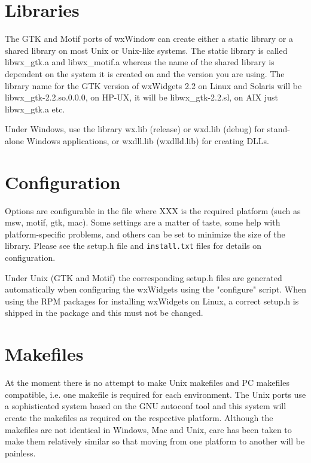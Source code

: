 \section{Libraries}

The GTK and Motif ports of wxWindow can create either a static library or a shared
library on most Unix or Unix-like systems. The static library is called libwx\_gtk.a
and libwx\_motif.a whereas the name of the shared library is dependent on the
system it is created on and the version you are using. The library name for the
GTK version of wxWidgets 2.2 on Linux and Solaris will be libwx\_gtk-2.2.so.0.0.0,
on HP-UX, it will be libwx\_gtk-2.2.sl, on AIX just libwx\_gtk.a etc.

Under Windows, use the library wx.lib (release) or wxd.lib (debug) for stand-alone Windows
applications, or wxdll.lib (wxdlld.lib) for creating DLLs.

\section{Configuration}

Options are configurable in the file
 where XXX is the required platform (such as msw, motif, gtk, mac). Some 
settings are a matter of taste, some help with platform-specific problems, and
others can be set to minimize the size of the library. Please see the setup.h file
and {\tt install.txt} files for details on configuration.

Under Unix (GTK and Motif) the corresponding setup.h files are generated automatically
when configuring the wxWidgets using the "configure" script. When using the RPM packages
for installing wxWidgets on Linux, a correct setup.h is shipped in the package and
this must not be changed.

\section{Makefiles}

At the moment there is no attempt to make Unix makefiles and
PC makefiles compatible, i.e. one makefile is required for
each environment. The Unix ports use a sophisticated system based
on the GNU autoconf tool and this system will create the
makefiles as required on the respective platform. Although the
makefiles are not identical in Windows, Mac and Unix, care has
been taken to make them relatively similar so that moving from
one platform to another will be painless.

